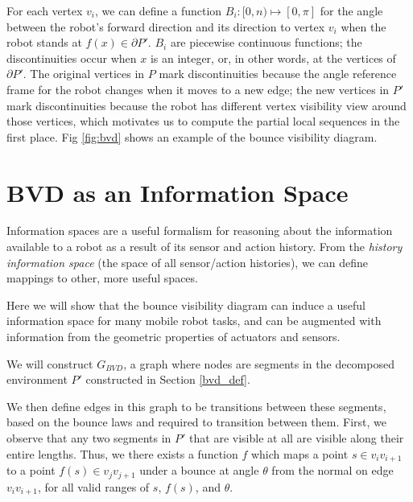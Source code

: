 \documentclass[]{styles/svproc}  %
\begin{document}
For each vertex $v_i$, we can define a function $B_i: [0, n) \mapsto [0, \pi]$
for the angle between the robot's forward direction and its direction to vertex
$v_i$ when the robot stands at $f(x)\in \partial P'$. $B_i$ are piecewise
continuous functions; the discontinuities occur when $x$ is an integer, or, in
other words, at the vertices of $\partial P'$. The original vertices in $P$ mark
discontinuities because the angle reference frame for the robot changes when it
moves to a new edge; the new vertices in $P'$ mark discontinuities because the
robot has different vertex visibility view around those vertices, which
motivates us to compute the partial local sequences in the first place.
Fig \ref{fig:bvd} shows an example of the bounce visibility diagram.

%



\section{BVD as an Information Space \label{bvd_info}}

Information spaces \cite{tovar2005information} are a useful formalism for
reasoning about the information available to a robot as a result of its sensor
and action history. From the \emph{history information space} (the space of all
sensor/action histories), we can define mappings to other, more useful spaces.

Here we will show that the bounce visibility diagram can induce a useful
information space for many mobile robot tasks, and can be augmented with
information from the geometric properties of actuators and sensors.

We will construct $G_{BVD}$, a graph where nodes are segments in the decomposed
environment $P'$ constructed in Section \ref{bvd_def}.

We then define edges in this graph to be transitions between these segments, based on the bounce laws and
required to transition between them. First, we observe that any two segments in
$P'$ that are visible at all are visible along their entire lengths. Thus, we
there exists a function $f$ which maps a point $s \in v_i
v_{i+1}$ to a point $f(s) \in v_j v_{j+1}$ under a bounce at angle $\theta$ from
the normal on edge $v_i v_{i+1}$, for all valid ranges of $s$, $f(s)$, and
$\theta$.
\end{document}
